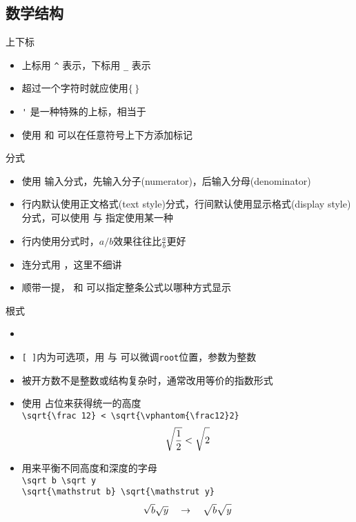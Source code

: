 \subsection{数学结构}
\begin{frame}[fragile]{上下标}
	\begin{itemize}
		\item 上标用 \verb|^| 表示，下标用 \verb|_| 表示
		\item 超过一个字符时就应使用$\{\,\}$
		\item \verb|'| 是一种特殊的上标，相当于 \cprotect\fbox{\verb|^\prime|}
		\item 使用 \cprotect\fbox{\verb|\overset|} 和 \cprotect\fbox{\verb|\underset|}可以在任意符号上下方添加标记
	\end{itemize}
\end{frame}
\begin{frame}[fragile]{分式}
	\begin{itemize}
		\item 使用 \cprotect{} 输入分式，先输入分子(numerator)，后输入分母(denominator)
		\item 行内默认使用正文格式(text style)分式，行间默认使用显示格式(display style)分式，可以使用 \cprotect\fbox{\verb|\tfrac|} 与 \cprotect\fbox{\verb|\dfrac|} 指定使用某一种
		\item 行内使用分式时，$a/b$效果往往比$\frac ab$更好
		\item 连分式用 \cprotect\fbox{\verb|\cfrac|}，这里不细讲
		\item 顺带一提，\cprotect\fbox{\verb|\textstyle|} 和 \cprotect\fbox{\verb|\displaystyle|} 可以指定整条公式以哪种方式显示
	\end{itemize}
\end{frame}
\begin{frame}[fragile]{根式}
	\begin{itemize}
		\item \cprotect{}
		\item \texttt{[\,]}内为可选项，用\cprotect\fbox{\verb|\uproot|} 与 \cprotect\fbox{\verb|\leftroot|} 可以微调\texttt{root}位置，参数为整数
		\item 被开方数不是整数或结构复杂时，通常改用等价的指数形式
		\item 使用 \cprotect\fbox{\verb|\vphantom|} 占位来获得统一的高度\\[1ex]
		\verb|\sqrt{\frac 12} < \sqrt{\vphantom{\frac12}2}|
		\[\sqrt{\frac 12} < \sqrt{\vphantom{\frac12}2}\]
		\item \cprotect\fbox{\verb|\mathstrut|} 用来平衡不同高度和深度的字母\\[1ex]
		\verb|\sqrt b \sqrt y|\\
		\verb|\sqrt{\mathstrut b} \sqrt{\mathstrut y}|
		\[\sqrt b \sqrt y \quad \rightarrow \quad \sqrt{\mathstrut b} \sqrt{\mathstrut y}\]
	\end{itemize}
\end{frame}
